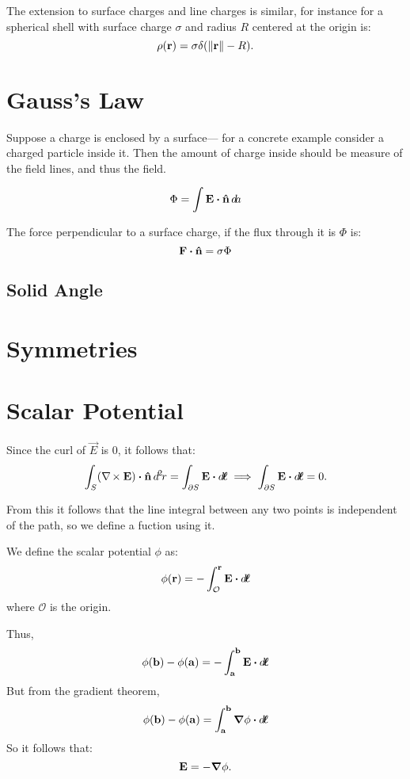 The extension to surface charges and line charges is similar, for instance for a spherical shell with 
surface charge $\sigma$ and radius $R$ centered at the origin is:
\[
\rho(\mathbf{\boldsymbol{r}}) = \sigma \delta(\norm{\mathbf{\boldsymbol{r}}} - R).
\]


\section{Gauss's Law}

Suppose a charge is enclosed by a surface--- for a concrete example consider a charged particle inside it. 
Then the amount of charge inside should be measure of the field lines, and thus the field. 

\[
\Phi = \int \vec{E} \vdot \uvec{n} \dd{a}  
\]

The force perpendicular to a surface charge, if the flux through it is $\Phi$ is:
\[
\vec{F} \vdot \uvec{n}  = \sigma \Phi 
\]

\subsection{Solid Angle}

\section{Symmetries}

\section{Scalar Potential}

Since the curl of $\vec{E}$ is 0, it follows that:
\[
\int_{S} (\curl{\vec{E}}) \vdot \uvec{n} \dd[2]{r} = \int_{\partial S} \vec{E} \vdot \dd{\vec{\ell}} \implies 
\int_{\partial S} \vec{E} \vdot \dd{\vec{\ell}} = 0.
\]

From this it follows that the line integral between any two points is independent of the path, so we define 
a fuction using it.

\begin{definition}
    We define the scalar potential $\phi$ as:
    \begin{equation}
        \phi(\vec{r}) = -\int_{\mathcal{O}}^\vec{r} \vec{E} \vdot \dd{\vec{\ell}} 
    \end{equation}
    where $\mathcal{O}$ is the origin.
\end{definition}

Thus,
\[
 \phi(\vec{b}) - \phi(\vec{a}) = -\int_{\vec{a}}^\vec{b} \vec{E} \vdot \dd{\vec{\ell}} 
\]
But from the gradient theorem,
\[
 \phi(\vec{b}) - \phi(\vec{a}) = \int_{\vec{a}}^\vec{b} \grad{\phi} \vdot \dd{\vec{\ell}} 
\]
So it follows that:
\begin{equation}
    \mathbf{\boldsymbol{E}} = -\grad{\phi}.
\end{equation}

